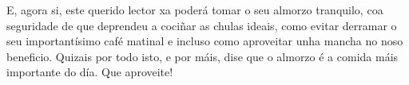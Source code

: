 \begin{multicols}{2}
E, agora si, este querido lector xa poderá tomar o seu almorzo tranquilo, coa
seguridade de que deprendeu a cociñar as chulas ideais, como evitar derramar o
seu importantísimo café matinal e incluso como aproveitar unha mancha no noso
beneficio. Quizais por todo isto, e por máis, dise que o almorzo é a comida
máis importante do día. Que aproveite!

\end{multicols}
